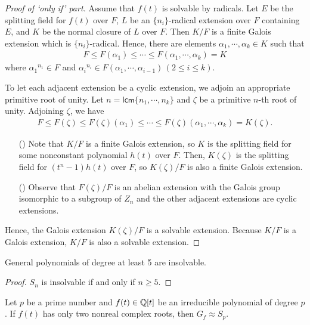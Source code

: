 \begin{proof}[Proof of `only if' part]
    Assume that $f(t)$ is solvable by radicals.
    Let $E$ be the splitting field for $f(t)$ over $F$, $L$ be an $\{n_i\}$-radical extension over $F$ containing $E$, and $K$ be the normal closure of $L$ over $F$.
    Then $K/F$ is a finite Galois extension which is $\{n_i\}$-radical.
    Hence, there are elements $\alpha_1, \cdots, \alpha_k\in K$ such that
    \begin{align*}
        F\leq F(\alpha_1)\leq \cdots\leq F(\alpha_1, \cdots, \alpha_k)=K
    \end{align*}
    where ${\alpha_1}^{n_1}\in F$ and ${\alpha_i}^{n_i}\in F(\alpha_1, \cdots, \alpha_{i-1})\,(2\leq i\leq k)$.

    \color{teal}To let each adjacent extension be a cyclic extension, we adjoin an appropriate primitive root of unity\color{black}.
    Let $n=\textsf{lcm}\{n_1, \cdots, n_k\}$ and $\zeta$ be a primitive $n$-th root of unity.
    Adjoining $\zeta$, we have
    \begin{align*}
        F\leq F(\zeta)\leq F(\zeta)(\alpha_1)\leq \cdots\leq F(\zeta)(\alpha_1, \cdots, \alpha_k)=K(\zeta).
    \end{align*}
    \begin{enumerate}
        \item[(\romannumeral 1)]
        {
            Note that \color{teal}$K/F$ is a finite Galois extension, so $K$ is the splitting field for some nonconstant polynomial $h(t)$ over $F$\color{black}.
            Then, $K(\zeta)$ is the splitting field for $(t^n-1)h(t)$ over $F$, so $K(\zeta)/F$ is also a finite Galois extension.
        }
        \item[(\romannumeral 2)]
        {
            Observe that $F(\zeta)/F$ is an abelian extension with the Galois group isomorphic to a subgroup of $Z_n$ and the other adjacent extensions are cyclic extensions.
        }
    \end{enumerate}
    Hence, the Galois extension $K(\zeta)/F$ is a solvable extension.
    Because $K/F$ is a Galois extension, $K/F$ is also a solvable extension.
\end{proof}
\begin{cor}
    General polynomials of degree at least 5 are insolvable.
\end{cor}
\begin{proof}
    $S_n$ is insolvable if and only if $n\geq 5$.
\end{proof}
\begin{prop}
    Let $p$ be a prime number and $f(t)\in{\mathbb{Q}}[t]$ be an irreducible polynomial of degree $p$.
    If $f(t)$ has only two nonreal complex roots, then $G_f\approx S_p$.
\end{prop}
